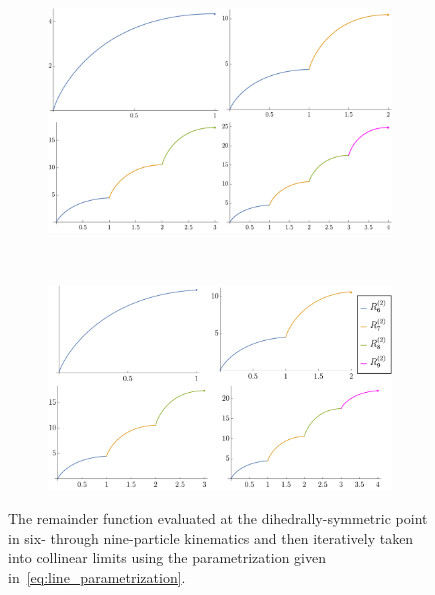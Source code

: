 \documentclass[11pt]{article}
\begin{document}
\begin{figure}[t]
\captionsetup[subfigure]{labelformat=empty}
\begin{center}
  \begin{subfigure}[b]{0.85\textwidth}
    \includegraphics[width=\textwidth]{symmetric_lines.pdf}
  \end{subfigure}
\  %
  \begin{subfigure}[t]{0.1\textwidth} \vspace{-7cm}
    \includegraphics[width=\textwidth]{symmetric_lines_label.pdf}
  \end{subfigure}
    \caption{The remainder function evaluated at the dihedrally-symmetric point in six- through nine-particle kinematics and then iteratively taken into collinear limits using the parametrization given in~\eqref{eq:line_parametrization}.}
    \label{fig:symm_to_collinear_lines}
\end{center}
\end{figure}
\end{document}
